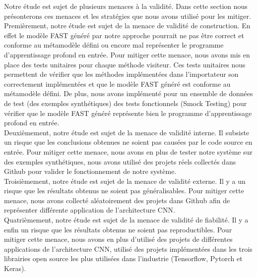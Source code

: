 \label{sec:threats}
Notre étude est sujet de plusieurs menaces à la validité. Dans cette section
nous présonterons ces menaces et les stratégies que nous avons utilisé pour les
mitiger.\\

Premièrement, notre étude est sujet de la menace de validité de construction. En
effet le modèle FAST généré par notre approche pourrait ne pas être correct et conforme au métamodèle défini ou encore mal
représenter le programme d'apprentissage profond en entrée. Pour mitiger cette
menace, nous avons mis en place des tests unitaires pour chaque méthode
visiteur. Ces tests unitaires nous permettent de vérifier que les méthodes
implémentées dans l'importateur son correctement implémentées et que le modèle
FAST généré est conforme au métamodèle défini. De plus, nous avons implémenté
pour un ensemble de données de test (des exemples synthétiques) des tests
fonctionnels (Smock Testing) pour vérifier que le modèle FAST généré représente bien le
programme d'apprentissage profond en entrée.\\

Deuxièmement, notre étude est sujet de la menace de validité interne. Il
subsiste un risque que les conclusions obtenues ne soient pas causées par le
code source en entrée. Pour mitiger cette menace, nous avons en plus de tester
notre système sur des exemples synthétiques, nous avons utilisé des projets
réels collectés dans Github pour valider le fonctionnement de notre système.\\

Troisièmement, notre étude est sujet de la menace de validité externe. Il y a un
risque que les résultats obtenus ne soient pas généralisables. Pour mitiger
cette menace, nous avons collecté aléatoirement des projets dans Github afin de
représenter différente application de l'architecture CNN.\\

Quatrièmement, notre étude est sujet de la menace de validité de fiabilité. Il y
a enfin un risque que les résultats obtenus ne soient pas reproductibles. Pour
mitiger cette menace, nous avons en plus d'utilisé des projets de différentes
applications de l'architecture CNN, utilisé des projets implémentées dans les
trois librairies open source les plus utilisées dans l'industrie (Tensorflow, Pytorch et Keras).



















